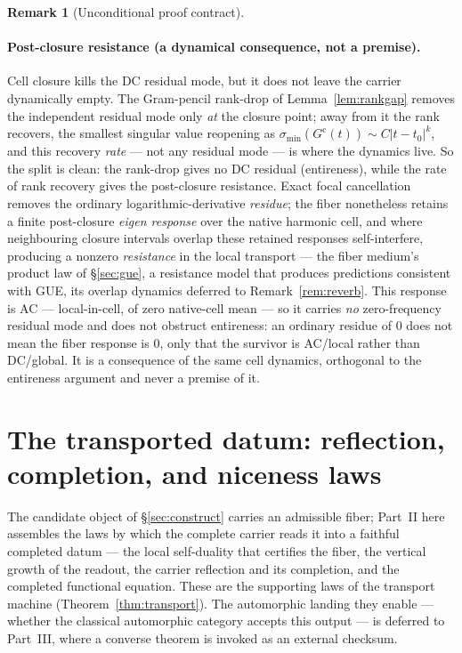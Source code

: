\documentclass[11pt]{article}
\theoremstyle{definition}
\newtheorem{remark}[theorem]{Remark}
\begin{document}
\begin{remark}[Unconditional proof contract]
\begin{enumerate}
\paragraph{Post-closure resistance (a dynamical consequence, not a premise).} Cell closure kills the DC
residual mode, but it does not leave the carrier dynamically empty. The Gram-pencil rank-drop of
Lemma~\ref{lem:rankgap} removes the independent residual mode only \emph{at} the closure point; away from it
the rank recovers, the smallest singular value reopening as $\sigma_{\min}(G^{\mathrm c}(t))\sim C|t-t_0|^{k}$,
and this recovery \emph{rate} --- not any residual mode --- is where the dynamics live. So the split is clean:
the rank-drop gives no DC residual (entireness), while the rate of rank recovery gives the post-closure
resistance. Exact focal cancellation removes the ordinary logarithmic-derivative \emph{residue}; the fiber
nonetheless retains a finite post-closure \emph{eigen response} over the native harmonic cell, and where
neighbouring closure intervals overlap these retained responses self-interfere, producing a nonzero
\emph{resistance} in the local transport --- the
fiber medium's product law of \S\ref{sec:gue}, a resistance model that produces predictions consistent with
GUE, its overlap dynamics deferred to Remark~\ref{rem:reverb}. This response is AC --- local-in-cell, of
zero native-cell mean --- so it carries
\emph{no} zero-frequency residual mode and does not obstruct entireness: an ordinary residue of $0$ does not
mean the fiber response is $0$, only that the survivor is AC/local rather than DC/global. It is a
consequence of the same cell dynamics, orthogonal to the entireness argument and never a premise of it.

\section{The transported datum: reflection, completion, and niceness laws}\label{sec:converse}

The candidate object of \S\ref{sec:construct} carries an admissible fiber; Part~II here assembles the laws by
which the complete carrier reads it into a faithful completed datum --- the local self-duality that certifies
the fiber, the vertical growth of the readout, the carrier reflection and its completion, and the completed
functional equation. These are the supporting laws of the transport machine (Theorem~\ref{thm:transport}).
The automorphic landing they enable --- whether the classical automorphic category accepts this output --- is
deferred to Part~III, where a converse theorem is invoked as an external checksum.


\end{enumerate}
\end{remark}
\end{document}
